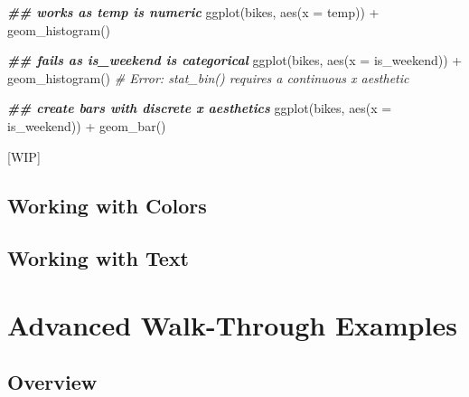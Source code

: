 \documentclass[
]{krantz}
\makeatletter
\newenvironment{Shaded}{\begin{snugshade}}{\end{snugshade}}
\newcommand{\AttributeTok}[1]{\textcolor[rgb]{0.61,0.61,0.61}{#1}}
\newcommand{\CommentTok}[1]{\textcolor[rgb]{0.37,0.37,0.37}{\textit{#1}}}
\newcommand{\DocumentationTok}[1]{\textcolor[rgb]{0.37,0.37,0.37}{\textbf{\textit{#1}}}}
\newcommand{\FunctionTok}[1]{\textcolor[rgb]{0,0,0}{#1}}
\newcommand{\NormalTok}[1]{#1}
\newcommand{\SpecialCharTok}[1]{\textcolor[rgb]{0,0,0}{#1}}
\newenvironment{kframe}{%
\medskip{}
\setlength{\fboxsep}{.8em}
 \def\at@end@of@kframe{}%
 \ifinner\ifhmode%
  \def\at@end@of@kframe{\end{minipage}}%
  \begin{minipage}{\columnwidth}%
 \fi\fi%
 \def\FrameCommand##1{\hskip\@totalleftmargin \hskip-\fboxsep
 \colorbox{shadecolor}{##1}\hskip-\fboxsep
     \hskip-\linewidth \hskip-\@totalleftmargin \hskip\columnwidth}%
 \MakeFramed {\advance\hsize-\width
   \@totalleftmargin\z@ \linewidth\hsize
   \@setminipage}}%
 {\par\unskip\endMakeFramed%
 \at@end@of@kframe}
\renewenvironment{Shaded}{\begin{kframe}}{\end{kframe}}
\makeatother
\begin{document}
\begin{Shaded}
\begin{Highlighting}[]
\DocumentationTok{\#\# works as \textasciigrave{}temp\textasciigrave{} is numeric}
\FunctionTok{ggplot}\NormalTok{(bikes, }\FunctionTok{aes}\NormalTok{(}\AttributeTok{x =}\NormalTok{ temp)) }\SpecialCharTok{+} \FunctionTok{geom\_histogram}\NormalTok{()}

\DocumentationTok{\#\# fails as \textasciigrave{}is\_weekend\textasciigrave{} is categorical}
\FunctionTok{ggplot}\NormalTok{(bikes, }\FunctionTok{aes}\NormalTok{(}\AttributeTok{x =}\NormalTok{ is\_weekend)) }\SpecialCharTok{+} \FunctionTok{geom\_histogram}\NormalTok{()}
\CommentTok{\# Error: \textasciigrave{}stat\_bin()\textasciigrave{} requires a continuous x aesthetic}

\DocumentationTok{\#\# create bars with discrete x aesthetics}
\FunctionTok{ggplot}\NormalTok{(bikes, }\FunctionTok{aes}\NormalTok{(}\AttributeTok{x =}\NormalTok{ is\_weekend)) }\SpecialCharTok{+} \FunctionTok{geom\_bar}\NormalTok{()}
\end{Highlighting}
\end{Shaded}

{[}WIP{]}

\hypertarget{working-with-colors}{%
\chapter{Working with Colors}\label{working-with-colors}}

\hypertarget{working-with-text}{%
\chapter{Working with Text}\label{working-with-text}}

\hypertarget{part-advanced-walk-through-examples}{%
\part{Advanced Walk-Through Examples}\label{part-advanced-walk-through-examples}}

\hypertarget{advanced-examples}{%
\chapter{Overview}\label{advanced-examples}}

\cleardoublepage

\hypertarget{appendix-appendix}{%
\appendix {}}
\end{document}
